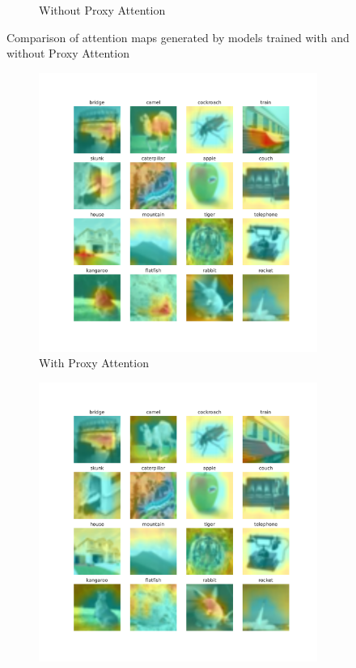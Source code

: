 \begin{figure}[h]
\begin{subfigure}[b]{.7\textwidth}
        \caption{Without Proxy Attention}
        \label{fig:noproxy2}
    \end{subfigure}
    \caption{Comparison of attention maps generated by models trained with and without Proxy Attention}
    \label{fig:attention2}
\end{figure}

\begin{figure}[h]
    \centering
    \begin{subfigure}[b]{0.7\textwidth}
        \includegraphics[width=\textwidth]{images/proxy_2.pdf}
        \caption{With Proxy Attention}
        \label{fig:proxy3}
    \end{subfigure}
    \hfill
    \begin{subfigure}[b]{.7\textwidth}
        \includegraphics[width=\textwidth]{images/noproxy_2.pdf}

\end{subfigure}
\end{figure}
